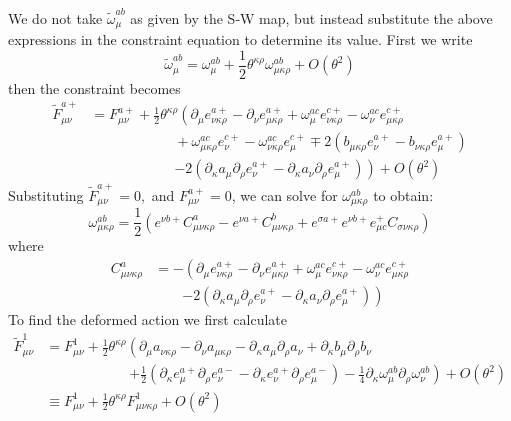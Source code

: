 \documentclass[a4paper,a4paper]{article}
\begin{document}
We do not take $\widetilde{\omega}_{\mu}^{ab}$ as given by the S-W map, but
instead substitute the above expressions in the constraint equation to
determine its value. First we write
\[
\widetilde{\omega}_{\mu}^{ab}=\omega_{\mu}^{ab}+\frac{1}{2}\theta^{\kappa\rho
}\omega_{\mu\kappa\rho}^{ab}+O(\theta^{2})
\]
then the constraint becomes
\begin{align*}
\widetilde{F}_{\mu\nu}^{a+}  &  =F_{\mu\nu}^{a+}+\frac{1}{2}\theta^{\kappa
\rho}\left(  \partial_{\mu}e_{\nu\kappa\rho}^{a+}-\partial_{\nu}e_{\mu
\kappa\rho}^{a+}+\omega_{\mu}^{ac}e_{\nu\kappa\rho}^{c+}-\omega_{\nu}%
^{ac}e_{\mu\kappa\rho}^{c+}\right. \\
&  \qquad\qquad\qquad+\omega_{\mu\kappa\rho}^{ac}e_{\nu}^{c+}-\omega
_{\nu\kappa\rho}^{ac}e_{\mu}^{c+}\mp2\left(  b_{\mu\kappa\rho}e_{\nu}%
^{a+}-b_{\nu\kappa\rho}e_{\mu}^{a+}\right) \\
&  \qquad\qquad\qquad\left.  -2\left(  \partial_{\kappa}a_{\mu}\partial_{\rho
}e_{\nu}^{a+}-\partial_{\kappa}a_{\nu}\partial_{\rho}e_{\mu}^{a+}\right)
\right)  +O(\theta^{2})
\end{align*}
Substituting $\widetilde{F}_{\mu\nu}^{a+}=0,$ and $F_{\mu\nu}^{a+}=0$, we can
solve for $\omega_{\mu\kappa\rho}^{ab}$ to obtain:
\[
\omega_{\mu\kappa\rho}^{ab}=\frac{1}{2}\left(  e^{\nu b+}C_{\mu\nu\kappa\rho
}^{a}-e^{\nu a+}C_{\mu\nu\kappa\rho}^{b}+e^{\sigma a+}e^{\nu b+}e_{\mu c}%
^{+}C_{\sigma\nu\kappa\rho}\right)
\]
where
\begin{align*}
C_{\mu\nu\kappa\rho}^{a}  &  =-\left(  \partial_{\mu}e_{\nu\kappa\rho}%
^{a+}-\partial_{\nu}e_{\mu\kappa\rho}^{a+}+\omega_{\mu}^{ac}e_{\nu\kappa\rho
}^{c+}-\omega_{\nu}^{ac}e_{\mu\kappa\rho}^{c+}\right. \\
&  \qquad\left.  -2\left(  \partial_{\kappa}a_{\mu}\partial_{\rho}e_{\nu}%
^{a+}-\partial_{\kappa}a_{\nu}\partial_{\rho}e_{\mu}^{a+}\right)  \right)
\end{align*}
To find the deformed action we first calculate
\begin{align*}
\widetilde{F}_{\mu\nu}^{1}  &  =F_{\mu\nu}^{1}+\frac{1}{2}\theta^{\kappa\rho
}\left(  \partial_{\mu}a_{\nu\kappa\rho}-\partial_{\nu}a_{\mu\kappa\rho
}-\partial_{\kappa}a_{\mu}\partial_{\rho}a_{\nu}+\partial_{\kappa}b_{\mu
}\partial_{\rho}b_{\nu}\right. \\
&  \qquad\qquad\qquad\left.  +\frac{1}{2}\left(  \partial_{\kappa}e_{\mu}%
^{a+}\partial_{\rho}e_{\nu}^{a-}-\partial_{\kappa}e_{\nu}^{a+}\partial_{\rho
}e_{\mu}^{a-}\right)  -\frac{1}{4}\partial_{\kappa}\omega_{\mu}^{ab}%
\partial_{\rho}\omega_{\nu}^{ab}\right)  +O(\theta^{2})\\
&  \equiv F_{\mu\nu}^{1}+\frac{1}{2}\theta^{\kappa\rho}F_{\mu\nu\kappa\rho
}^{1}+O(\theta^{2})
\end{align*}%
\end{document}
